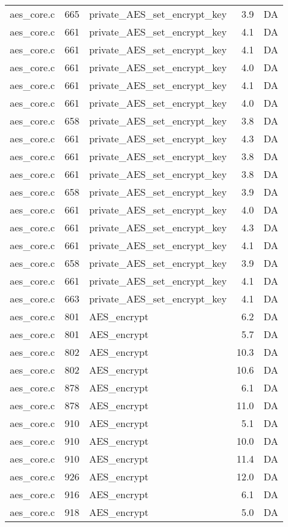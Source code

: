 \begin{table}[!ht]
\begin{tabular}{lrlrr}
aes\_core.c& 665&private\_AES\_set\_encrypt\_key&3.9 &DA\\
aes\_core.c& 661&private\_AES\_set\_encrypt\_key&4.1 &DA\\
aes\_core.c& 661&private\_AES\_set\_encrypt\_key&4.1 &DA\\
aes\_core.c& 661&private\_AES\_set\_encrypt\_key&4.0 &DA\\
aes\_core.c& 661&private\_AES\_set\_encrypt\_key&4.1 &DA\\
aes\_core.c& 661&private\_AES\_set\_encrypt\_key&4.0 &DA\\
aes\_core.c& 658&private\_AES\_set\_encrypt\_key&3.8 &DA\\
aes\_core.c& 661&private\_AES\_set\_encrypt\_key&4.3 &DA\\
aes\_core.c& 661&private\_AES\_set\_encrypt\_key&3.8 &DA\\
aes\_core.c& 661&private\_AES\_set\_encrypt\_key&3.8 &DA\\
aes\_core.c& 658&private\_AES\_set\_encrypt\_key&3.9 &DA\\
aes\_core.c& 661&private\_AES\_set\_encrypt\_key&4.0 &DA\\
aes\_core.c& 661&private\_AES\_set\_encrypt\_key&4.3 &DA\\
aes\_core.c& 661&private\_AES\_set\_encrypt\_key&4.1 &DA\\
aes\_core.c& 658&private\_AES\_set\_encrypt\_key&3.9 &DA\\
aes\_core.c& 661&private\_AES\_set\_encrypt\_key&4.1 &DA\\
aes\_core.c& 663&private\_AES\_set\_encrypt\_key&4.1 &DA\\
aes\_core.c& 801&AES\_encrypt&6.2 &DA\\
aes\_core.c& 801&AES\_encrypt&5.7 &DA\\
aes\_core.c& 802&AES\_encrypt&10.3 &DA\\
aes\_core.c& 802&AES\_encrypt&10.6 &DA\\
aes\_core.c& 878&AES\_encrypt&6.1 &DA\\
aes\_core.c& 878&AES\_encrypt&11.0 &DA\\
aes\_core.c& 910&AES\_encrypt&5.1 &DA\\
aes\_core.c& 910&AES\_encrypt&10.0 &DA\\
aes\_core.c& 910&AES\_encrypt&11.4 &DA\\
aes\_core.c& 926&AES\_encrypt&12.0 &DA\\
aes\_core.c& 916&AES\_encrypt&6.1 &DA\\
aes\_core.c& 918&AES\_encrypt&5.0 &DA\\

\end{tabular}
\end{table}
